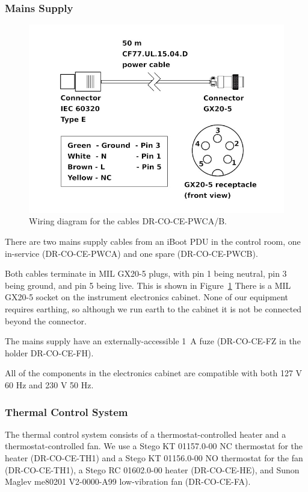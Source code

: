 \documentclass{article}
\begin{document}
\subsubsection{Mains Supply}

\begin{figure}[tp]
\begin{center}
\includegraphics[width=0.9\linewidth]{figures/DR-CO-CE-PWC.jpg}
\end{center}
\caption{Wiring diagram for the cables DR-CO-CE-PWCA/B.}
\label{figure:DR-CO-CE-PWC}
\end{figure}

There are two mains supply cables from an iBoot PDU in the control room, one in-service (DR-CO-CE-PWCA) and one spare (DR-CO-CE-PWCB).

Both cables terminate in MIL GX20-5 plugs, with pin 1 being neutral, pin 3 being ground, and pin 5 being live. This is shown in Figure~\ref{figure:DR-CO-CE-PWC}
There is a MIL GX20-5 socket on the instrument electronics cabinet. None of our equipment requires earthing, so although we run earth to the cabinet it is not be connected beyond the connector.

The mains supply have an externally-accessible 1~A fuze (DR-CO-CE-FZ in the holder DR-CO-CE-FH).

All of the components in the electronics cabinet are compatible with both 127 V 60 Hz and 230 V 50 Hz.

\subsubsection{Thermal Control System}

The thermal control system consists of a thermostat-controlled heater and a thermostat-controlled fan. We use a Stego KT 01157.0-00 NC thermostat for the heater (DR-CO-CE-TH1) and a Stego KT 01156.0-00 NO thermostat for the fan (DR-CO-CE-TH1), a Stego RC 01602.0-00 heater (DR-CO-CE-HE), and Sunon Maglev me80201 V2-0000-A99 low-vibration fan (DR-CO-CE-FA). 
\end{document}
